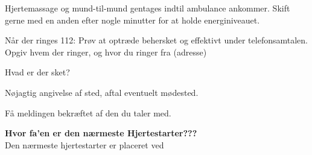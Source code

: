 Hjertemassage og mund-til-mund gentages indtil ambulance ankommer. Skift gerne med en anden efter nogle minutter for at holde energiniveauet. 


Når der ringes 112: Prøv at optræde behersket og effektivt under telefonsamtalen.
Opgiv hvem der ringer, og hvor du ringer fra (adresse)


Hvad er der sket?


Nøjagtig angivelse af sted, aftal eventuelt mødested.


Få meldingen bekræftet af den du taler med.


\textbf{Hvor fa'en er den nærmeste Hjertestarter???}\\
Den nærmeste hjertestarter er placeret ved \placeholder



